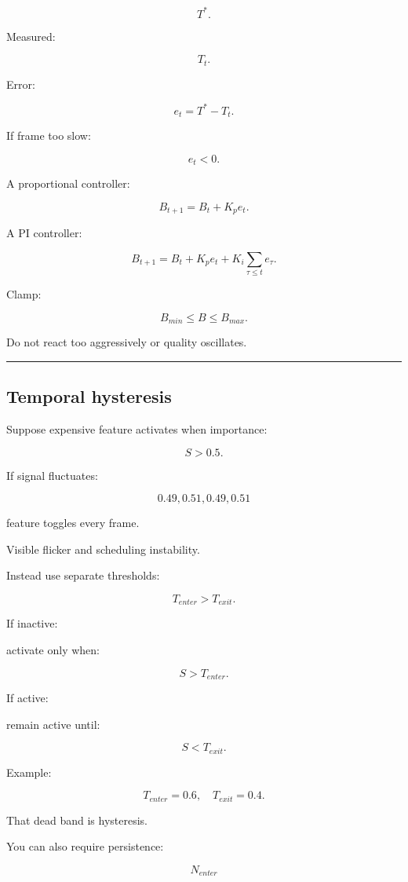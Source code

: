 \[
T^*.
\]

Measured:

\[
T_t.
\]

Error:

\[
e_t=
T^*-T_t.
\]

If frame too slow:

\[
e_t<0.
\]

A proportional controller:

\[
B_{t+1}
=
B_t
+
K_p e_t.
\]

A PI controller:

\[
\boxed{
B_{t+1}
=
B_t
+
K_p e_t
+
K_i\sum_{\tau\le t}e_\tau.
}
\]

Clamp:

\[
B_{min}\le B\le B_{max}.
\]

Do not react too aggressively or quality oscillates.

\begin{center}\rule{0.5\linewidth}{0.5pt}\end{center}

\subsection{Temporal hysteresis}\label{04-visual-computing-ii-ch040-temporal-hysteresis}

Suppose expensive feature activates when importance:

\[
S>0.5.
\]

If signal fluctuates:

\[
0.49,0.51,0.49,0.51
\]

feature toggles every frame.

Visible flicker and scheduling instability.

Instead use separate thresholds:

\[
\boxed{
T_{enter}>T_{exit}.
}
\]

If inactive:

activate only when:

\[
S>T_{enter}.
\]

If active:

remain active until:

\[
S<T_{exit}.
\]

Example:

\[
T_{enter}=0.6,
\quad
T_{exit}=0.4.
\]

That dead band is hysteresis.

You can also require persistence:

\[
N_{enter}
\]


